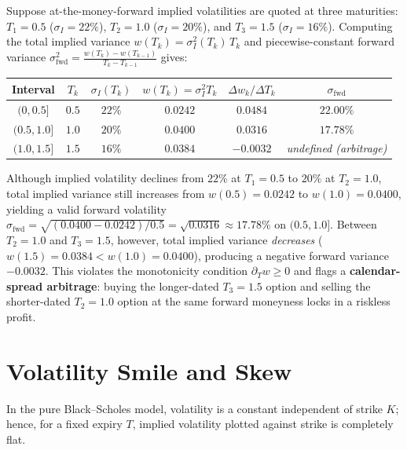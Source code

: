 \begin{example}
    \label{ex:ch05-fwd-var}
    Suppose at-the-money-forward implied volatilities are quoted at three maturities: $T_1 = 0.5$ ($\sigma_I = 22\%$), $T_2 = 1.0$ ($\sigma_I = 20\%$), and $T_3 = 1.5$ ($\sigma_I = 16\%$). Computing the total implied variance $w(T_k) = \sigma_I^2(T_k)\,T_k$ and piecewise-constant forward variance $\sigma_{\mathrm{fwd}}^2 = \frac{w(T_k) - w(T_{k-1})}{T_k - T_{k-1}}$ gives:
    \begin{center}
        \begin{tabular}{cccccc}
            \toprule
            \textbf{Interval} & $T_k$ & $\sigma_I(T_k)$ & $w(T_k) = \sigma_I^2 T_k$ & $\Delta w_k / \Delta T_k$ & $\sigma_{\mathrm{fwd}}$ \\
            \midrule
            $(0, 0.5]$   & $0.5$ & $22\%$ & $0.0242$ & $0.0484$  & $22.00\%$ \\
            $(0.5, 1.0]$ & $1.0$ & $20\%$ & $0.0400$ & $0.0316$  & $17.78\%$ \\
            $(1.0, 1.5]$ & $1.5$ & $16\%$ & $0.0384$ & $-0.0032$ & \emph{undefined (arbitrage)} \\
            \bottomrule
        \end{tabular}
    \end{center}
    Although implied volatility declines from $22\%$ at $T_1 = 0.5$ to $20\%$ at $T_2 = 1.0$, total implied variance still increases from $w(0.5) = 0.0242$ to $w(1.0) = 0.0400$, yielding a valid forward volatility $\sigma_{\mathrm{fwd}} = \sqrt{(0.0400 - 0.0242)/0.5} = \sqrt{0.0316} \approx 17.78\%$ on $(0.5, 1.0]$. Between $T_2 = 1.0$ and $T_3 = 1.5$, however, total implied variance \emph{decreases} ($w(1.5) = 0.0384 < w(1.0) = 0.0400$), producing a negative forward variance $-0.0032$. This violates the monotonicity condition $\partial_T w \ge 0$ and flags a \textbf{calendar-spread arbitrage}: buying the longer-dated $T_3 = 1.5$ option and selling the shorter-dated $T_2 = 1.0$ option at the same forward moneyness locks in a riskless profit.
\end{example}

\section{Volatility Smile and Skew}
\label{sec:ch05-smile}

In the pure Black--Scholes model, volatility is a constant independent of strike $K$; hence, for a fixed expiry $T$, implied volatility plotted against strike is completely flat.

